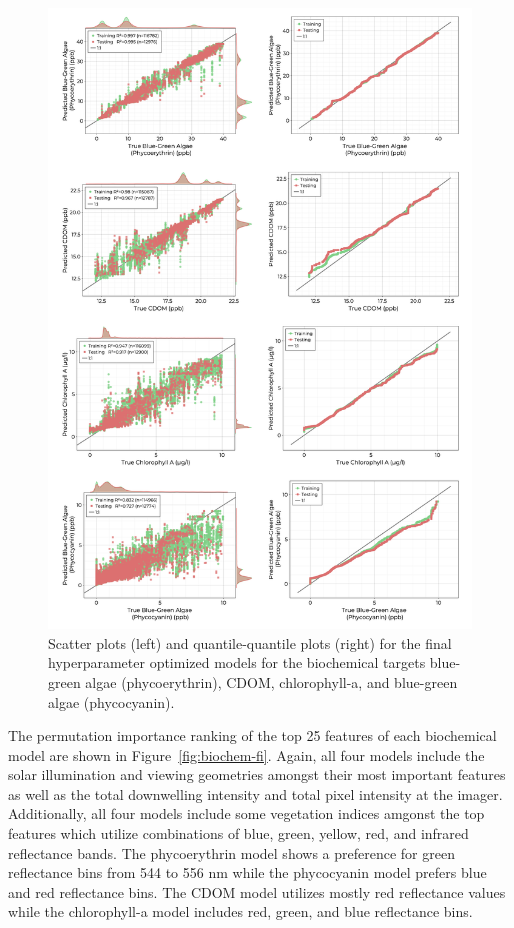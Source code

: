 \documentclass[sensors,article,submit,pdftex,moreauthors]{Definitions/mdpi}
\begin{document}
\begin{figure}
\centering
\includegraphics[width=\columnwidth]{paper/figures/results/fits/biochemical-fitres.png}
\caption{Scatter plots (left) and quantile-quantile plots (right) for the final hyperparameter optimized models for the biochemical targets blue-green algae (phycoerythrin), CDOM, chlorophyll-a, and blue-green algae (phycocyanin). \label{fig:biochem-fit}}
\end{figure}  

The permutation importance ranking of the top 25 features of each biochemical model are shown in Figure~\ref{fig:biochem-fi}. Again, all four models include the solar illumination and viewing geometries amongst their most important features as well as the total downwelling intensity and total pixel intensity at the imager. Additionally, all four models include some vegetation indices amgonst the top features which utilize combinations of blue, green, yellow, red, and infrared reflectance bands. The phycoerythrin model shows a preference for green reflectance bins from 544 to 556 nm while the phycocyanin model prefers blue and red reflectance bins. The CDOM model utilizes mostly red reflectance values while the chlorophyll-a model includes red, green, and blue reflectance bins. 
\end{document}
